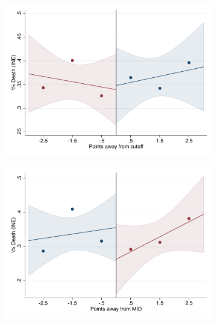 \documentclass[oneside,11pt]{article}
\begin{document}
\begin{figure}[H]

    \ContinuedFloat
    \caption{(Cont.) RD plots for outcome variables across those assigned to UNAM high-school, and those who are not\label{fig:ITT_rd_plot_UNAM_4}}
    \begin{center}
    
    \begin{subfigure}{0.475\textwidth}
        \centering
        \includegraphics[width=\textwidth]{04_Figures/rd_plot_tau_Death_INE_UNAM3.pdf}
    \end{subfigure}
    \begin{subfigure}{0.475\textwidth}
        \centering
        \includegraphics[width=\textwidth]{04_Figures/rd_plot_mid_Death_INE_UNAM3.pdf}
    \end{subfigure}


\end{center}
\end{figure}
\end{document}
